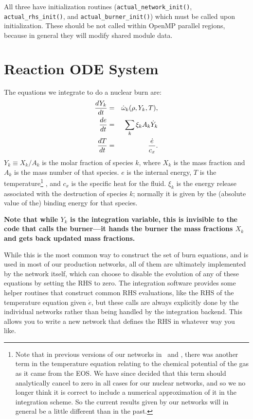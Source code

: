 All three have initialization routines ({\tt actual\_network\_init()},
{\tt actual\_rhs\_init()}, and {\tt actual\_burner\_init()}) which must
be called upon initialization. These should be not called within
OpenMP parallel regions, because in general they will modify shared module data.


\section{Reaction ODE System}

The equations we integrate to do a nuclear burn are:
\begin{eqnarray}
  \frac{dY_k}{dt} &=& \dot\omega_k(\rho,Y_k,T), \label{eq:spec_integrate} \\
  \frac{de}{dt} &=& \sum_k \xi_k A_k \dot{Y}_k \label{eq:enuc_integrate} \\
  \frac{dT}{dt} &=&\frac{\dot{e}}{c_x}. \label{eq:temp_integrate}
\end{eqnarray}
$Y_k \equiv X_k / A_k$ is the molar fraction of species $k$, where
$X_k$ is the mass fraction and $A_k$ is the mass number of that species.
$e$ is the internal energy, $T$ is the temperature\footnote{Note that in
previous versions of our networks in \castro\ and \maestro,
there was another term in the temperature equation relating to the
chemical potential of the gas as it came from the EOS. We have since
decided that this term should analytically cancel to zero in all cases
for our nuclear networks, and so we no longer think it is correct to
include a numerical approximation of it in the integration scheme. So
the current results given by our networks will in general be a little
different than in the past.}
, and $c_x$ is the specific heat for the fluid. $\xi_k$ is the energy
release associated with the destruction of species $k$; normally it
is given by the (absolute value of the) binding energy for that species.

{\bf Note that while $Y_k$ is the integration variable, this is invisible to
the code that calls the burner---it hands the burner the mass fractions $X_k$
and gets back updated mass fractions.}


While this is the most common way to construct the set of
burn equations, and is used in most of our production networks,
all of them are ultimately implemented by the network itself, which
can choose to disable the evolution of any of these equations by
setting the RHS to zero. The integration software provides some
helper routines that construct common RHS evaluations, like the RHS
of the temperature equation given $\dot{e}$, but these calls
are always explicitly done by the individual networks rather than
being handled by the integration backend. This allows you to write a
new network that defines the RHS in whatever way you like.

